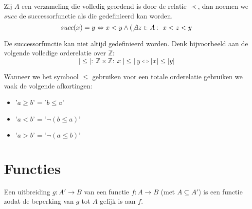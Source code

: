 \documentclass[main.tex]{subfiles}
\begin{document}
\begin{de}
  Zij $A$ een verzameling die volledig geordend is door de relatie $\prec$, dan noemen we $succ$ de successorfunctie als die gedefinieerd kan worden.
  \[ succ(x) = y \Leftrightarrow x < y \wedge (\not\exists z \in A:\ x < z < y \]
\end{de}

\begin{opm}
  De successorfunctie kan niet altijd gedefinieerd worden.
  Denk bijvoorbeeld aan de volgende volledige orderelatie over $\mathbb{Z}$:
  \[ |\le|:\ \mathbb{Z} \times \mathbb{Z}:\ x\ |\le|\ y \Leftrightarrow |x| \le |y| \]
\end{opm}

\begin{de}
  Wanneer we het symbool $\le$ gebruiken voor een totale orderelatie gebruiken we vaak de volgende afkortingen:
  \begin{itemize}
  \item '$a \ge b$' = '$b \le a$'
  \item '$a < b$' = '$\neg(b \le a)$'
  \item '$a > b$' = '$\neg(a \le b)$'
  \end{itemize}
\end{de}

\section{Functies}
\label{sec:functies}


\begin{de}
  Een uitbreiding $g:A' \rightarrow B$ van een functie $f:A \rightarrow B$ (met $A \subseteq A'$) is een functie zodat de beperking van $g$ tot $A$ gelijk is aan $f$.
\end{de}
\end{document}

